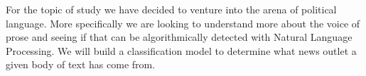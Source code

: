 For the topic of study we have decided to venture into the arena of political language. 
More specifically we are looking to understand more about the voice of prose and seeing if that can be algorithmically detected with Natural Language Processing.
We will build a classification model to determine what news outlet a given body of text has come from. 

